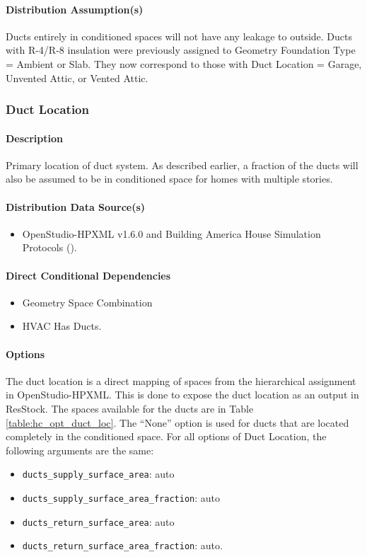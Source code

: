 \paragraph{Distribution Assumption(s)}
Ducts entirely in conditioned spaces will not have any leakage to outside. Ducts with R-4/R-8 insulation were previously assigned to Geometry Foundation Type = Ambient or Slab. They now correspond to those with Duct Location = Garage, Unvented Attic, or Vented Attic. 

\subsubsection{Duct Location}

\paragraph{Description}
Primary location of duct system. As described earlier, a fraction of the ducts will also be assumed to be in conditioned space for homes with multiple stories.

\paragraph{Distribution Data Source(s)}
\begin{itemize}
\item 

OpenStudio-HPXML v1.6.0 and Building America House Simulation Protocols (\cite{Wilson2014}). 
\end{itemize}


\paragraph{Direct Conditional Dependencies}
\begin{itemize}
    \item Geometry Space Combination
    \item HVAC Has Ducts.
\end{itemize}

\paragraph{Options}
The duct location is a direct mapping of spaces from the hierarchical assignment in OpenStudio-HPXML. This is done to expose the duct location as an output in ResStock. The spaces available for the ducts are in Table \ref{table:hc_opt_duct_loc}. The ``None'' option is used for ducts that are located completely in the conditioned space. For all options of Duct Location, the following arguments are the same: 
\begin{itemize}
    \item \texttt{ducts\_supply\_surface\_area}: auto
    \item \texttt{ducts\_supply\_surface\_area\_fraction}: auto
    \item  \texttt{ducts\_return\_surface\_area}: auto
    \item \texttt{ducts\_return\_surface\_area\_fraction}: auto.
\end{itemize}

